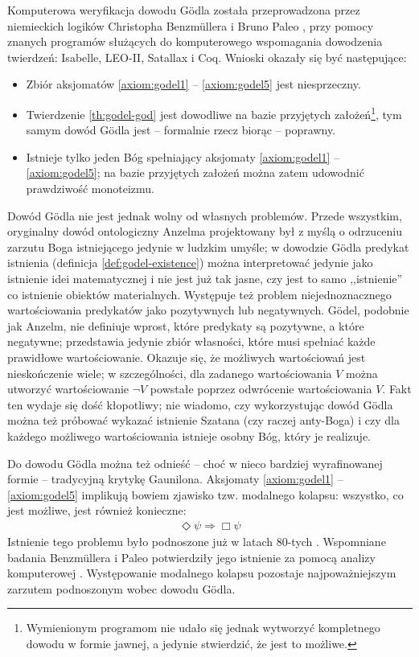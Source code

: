 \documentclass[
	runningheads
]{llncs}
\begin{document}
Komputerowa weryfikacja dowodu G\"odla została przeprowadzona przez niemieckich logików Christopha Benzm\"ullera i Bruno Paleo \cite{benzmuller2014}, \cite{benzmuller2016} przy pomocy znanych programów służących do komputerowego wspomagania dowodzenia twierdzeń: Isabelle, LEO-II, Satallax i Coq. Wnioski okazały się być następujące:
\begin{itemize}
	\item Zbiór aksjomatów \ref{axiom:godel1} -- \ref{axiom:godel5} jest niesprzeczny. 
	\item Twierdzenie \ref{th:godel-god} jest dowodliwe na bazie przyjętych założeń\footnote{Wymienionym programom nie udało się jednak wytworzyć kompletnego dowodu w formie jawnej, a jedynie stwierdzić, że jest to możliwe.}, tym samym dowód G\"odla jest -- formalnie rzecz biorąc -- poprawny.
	\item Istnieje tylko jeden Bóg spełniający aksjomaty \ref{axiom:godel1} -- \ref{axiom:godel5}; na bazie przyjętych założeń można zatem udowodnić prawdziwość monoteizmu. 
\end{itemize}
Dowód G\"odla nie jest jednak wolny od własnych problemów. Przede wszystkim, oryginalny dowód ontologiczny Anzelma projektowany był z myślą o odrzuceniu zarzutu Boga istniejącego jedynie w ludzkim umyśle; w dowodzie G\"odla predykat istnienia (definicja \ref{def:godel-existence}) można interpretować jedynie jako istnienie idei matematycznej i nie jest już tak jasne, czy jest to samo ,,istnienie'' co istnienie obiektów materialnych. Występuje też problem niejednoznacznego wartościowania predykatów jako pozytywnych lub negatywnych. G\"odel, podobnie jak Anzelm, nie definiuje wprost, które predykaty są pozytywne, a które negatywne; przedstawia jedynie zbiór własności, które musi spełniać każde prawidłowe wartościowanie. Okazuje się, że możliwych wartościowań jest nieskończenie wiele; w szczególności, dla zadanego wartościowania $V$ można utworzyć wartościowanie $\neg V$ powstałe poprzez odwrócenie wartościowania $V$. Fakt ten wydaje się dość kłopotliwy; nie wiadomo, czy wykorzystując dowód G\"odla można też próbować wykazać istnienie Szatana (czy raczej anty-Boga) i czy dla każdego możliwego wartościowania istnieje osobny Bóg, który je realizuje. 

Do dowodu G\"odla można też odnieść -- choć w nieco bardziej wyrafinowanej formie -- tradycyjną krytykę Gaunilona. Aksjomaty \ref{axiom:godel1} -- \ref{axiom:godel5} implikują bowiem zjawisko tzw. modalnego kolapsu: wszystko, co jest możliwe, jest również konieczne:
\begin{align*}
\Diamond \psi \Rightarrow \Box \psi
\end{align*}
Istnienie tego problemu było podnoszone już w latach 80-tych \cite{sobel1987}. Wspomniane badania Benzm\"ullera i Paleo potwierdziły jego istnienie za pomocą analizy komputerowej \cite{benzmuller2014}. Występowanie modalnego kolapsu pozostaje najpoważniejszym zarzutem podnoszonym wobec dowodu G\"odla. 
\end{document}
